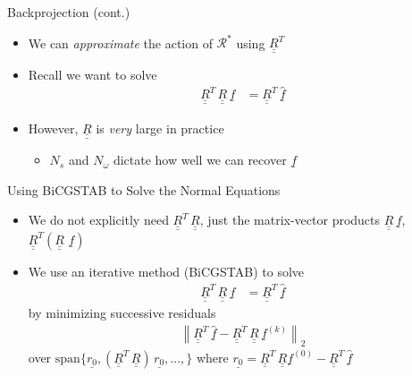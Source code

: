 \documentclass{beamer}
\newcommand{\bunderline}[1]{\underline{#1}}
\renewcommand{\vec}[1]{{\bunderline{#1}}}
\newcommand{\mat}[1]{{\bunderline{\bunderline{#1}}}}
\begin{document}
\begin{frame}{Backprojection (cont.)}
    \begin{itemize}
        \item We can \textit{approximate} the action of $\mathcal{R}^{*}$ using $\mat{R}^{T}$
        \item Recall we want to solve
        \begin{align*}
            \mat{R}^{T} \, \mat{R} \, \vec{f} & = \mat{R}^{T} \, \widehat{\vec{f}}
        \end{align*}
        \item However, $\mat{R}$  is \textit{very} large in practice
        \begin{itemize}
            \item $N_{s}$ and $N_{\omega}$ dictate how well we can recover $\vec{f}$
        \end{itemize}
    \end{itemize}
\end{frame}

\begin{frame}{Using BiCGSTAB to Solve the Normal Equations}
    \begin{itemize}
        \item We do not explicitly need $\mat{R}^{T} \, \mat{R}$, just the matrix-vector products $\mat{R} \, \vec{f}$, $\mat{R}^{T} \left(\mat{R} \, \, \vec{f} \right)$
        \item We use an iterative method (BiCGSTAB) to solve
        \begin{align*}
            \mat{R}^{T} \, \mat{R} \, \vec{f} & = \mat{R}^{T} \, \widehat{\vec{f}}
        \end{align*}
        by minimizing successive residuals
        \begin{align*}
            \left\| \mat{R}^{T} \, \widehat{\vec{f}} - \mat{R}^{T} \, \mat{R} \, \vec{f}^{(k)} \right\|_{2}
        \end{align*}
        over $\text{span} \{ \vec{r_0}, \left( \mat{R}^{T} \, \mat{R} \right) \, \vec{r_0}, \hdots, \}$ where $\vec{r_0} = \mat{R}^{T} \, \mat{R} \vec{f}^{(0)} - \mat{R}^{T} \, \vec{\widehat{f}}$
    \end{itemize}
\end{frame}
\end{document}
